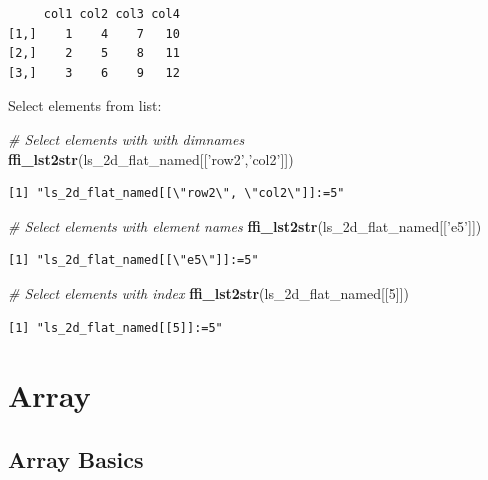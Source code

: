 \documentclass[
]{book}
\newenvironment{Shaded}{\begin{snugshade}}{\end{snugshade}}
\newcommand{\CommentTok}[1]{\textcolor[rgb]{0.56,0.35,0.01}{\textit{#1}}}
\newcommand{\DecValTok}[1]{\textcolor[rgb]{0.00,0.00,0.81}{#1}}
\newcommand{\KeywordTok}[1]{\textcolor[rgb]{0.13,0.29,0.53}{\textbf{#1}}}
\newcommand{\NormalTok}[1]{#1}
\newcommand{\StringTok}[1]{\textcolor[rgb]{0.31,0.60,0.02}{#1}}
\begin{document}
\begin{verbatim}
     col1 col2 col3 col4
[1,]    1    4    7   10
[2,]    2    5    8   11
[3,]    3    6    9   12
\end{verbatim}

Select elements from list:

\begin{Shaded}
\begin{Highlighting}[]
\CommentTok{# Select elements with with dimnames}
\KeywordTok{ffi_lst2str}\NormalTok{(ls_2d_flat_named[[}\StringTok{'row2'}\NormalTok{,}\StringTok{'col2'}\NormalTok{]])}
\end{Highlighting}
\end{Shaded}

\begin{verbatim}
[1] "ls_2d_flat_named[[\"row2\", \"col2\"]]:=5"
\end{verbatim}

\begin{Shaded}
\begin{Highlighting}[]
\CommentTok{# Select elements with element names}
\KeywordTok{ffi_lst2str}\NormalTok{(ls_2d_flat_named[[}\StringTok{'e5'}\NormalTok{]])}
\end{Highlighting}
\end{Shaded}

\begin{verbatim}
[1] "ls_2d_flat_named[[\"e5\"]]:=5"
\end{verbatim}

\begin{Shaded}
\begin{Highlighting}[]
\CommentTok{# Select elements with index}
\KeywordTok{ffi_lst2str}\NormalTok{(ls_2d_flat_named[[}\DecValTok{5}\NormalTok{]])}
\end{Highlighting}
\end{Shaded}

\begin{verbatim}
[1] "ls_2d_flat_named[[5]]:=5"
\end{verbatim}

\hypertarget{array}{%
\section{Array}\label{array}}

\hypertarget{array-basics}{%
\subsection{Array Basics}\label{array-basics}}
\end{document}
